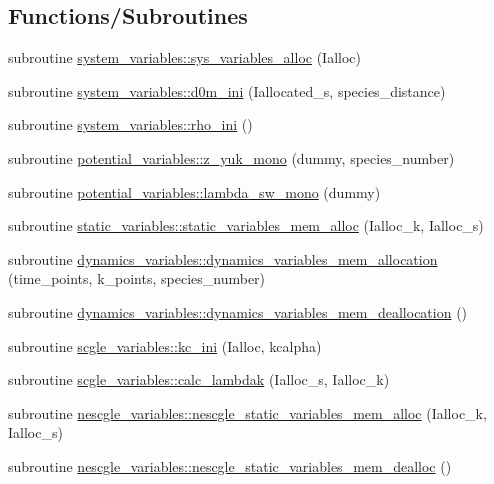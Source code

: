 \subsection*{Functions/\+Subroutines}
\begin{DoxyCompactItemize}
\item 
subroutine \hyperlink{namespacesystem__variables_a3582be6e12e8f8384b74e0cb1e095638}{system\+\_\+variables\+::sys\+\_\+variables\+\_\+alloc} (Ialloc)
\item 
subroutine \hyperlink{namespacesystem__variables_a2b1ed9ba21b87d2d006960362d8d866f}{system\+\_\+variables\+::d0m\+\_\+ini} (Iallocated\+\_\+s, species\+\_\+distance)
\item 
subroutine \hyperlink{namespacesystem__variables_a58dd4f7b930f29e7933128856a80d088}{system\+\_\+variables\+::rho\+\_\+ini} ()
\item 
subroutine \hyperlink{namespacepotential__variables_a1e535d33f3671819d12a1eb4cd230247}{potential\+\_\+variables\+::z\+\_\+yuk\+\_\+mono} (dummy, species\+\_\+number)
\item 
subroutine \hyperlink{namespacepotential__variables_a0414c052447b38ecd4c83b0ca2527c73}{potential\+\_\+variables\+::lambda\+\_\+sw\+\_\+mono} (dummy)
\item 
subroutine \hyperlink{namespacestatic__variables_aef5303f4ff2e5ebc171fdf5fffccc541}{static\+\_\+variables\+::static\+\_\+variables\+\_\+mem\+\_\+alloc} (Ialloc\+\_\+k, Ialloc\+\_\+s)
\item 
subroutine \hyperlink{namespacedynamics__variables_a5f591595162eb74c3236758d9132588f}{dynamics\+\_\+variables\+::dynamics\+\_\+variables\+\_\+mem\+\_\+allocation} (time\+\_\+points, k\+\_\+points, species\+\_\+number)
\item 
subroutine \hyperlink{namespacedynamics__variables_a68946260698d0399925366a48a4513ef}{dynamics\+\_\+variables\+::dynamics\+\_\+variables\+\_\+mem\+\_\+deallocation} ()
\item 
subroutine \hyperlink{namespacescgle__variables_a2d5d73d24ab9c9714dd4bcee9e87e064}{scgle\+\_\+variables\+::kc\+\_\+ini} (Ialloc, kcalpha)
\item 
subroutine \hyperlink{namespacescgle__variables_ad7a1a98998398627e24a0b96f046f956}{scgle\+\_\+variables\+::calc\+\_\+lambdak} (Ialloc\+\_\+s, Ialloc\+\_\+k)
\item 
subroutine \hyperlink{namespacenescgle__variables_a0023aa1810519536d79cdfd9c1106ddd}{nescgle\+\_\+variables\+::nescgle\+\_\+static\+\_\+variables\+\_\+mem\+\_\+alloc} (Ialloc\+\_\+k, Ialloc\+\_\+s)
\item 
subroutine \hyperlink{namespacenescgle__variables_a19bc97e5437e17b707c19cdd197a1fa8}{nescgle\+\_\+variables\+::nescgle\+\_\+static\+\_\+variables\+\_\+mem\+\_\+dealloc} ()
\end{DoxyCompactItemize}
